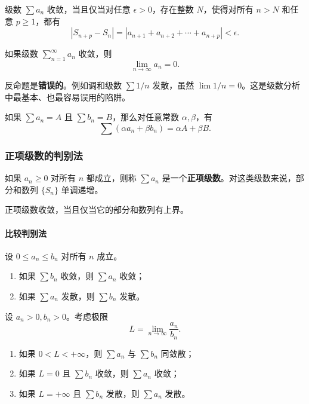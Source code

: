 \begin{theorem}
级数 $\sum a_n$ 收敛，当且仅当对任意 $\epsilon>0$，存在整数 $N$，使得对所有 $n>N$ 和任意 $p\geq 1$，都有
\[
    |S_{n+p}-S_n|=|a_{n+1}+a_{n+2}+\cdots+a_{n+p}|<\epsilon.
\]
\end{theorem}

\begin{theorem}[收敛的必要条件]
如果级数 $\sum_{n=1}^{\infty}a_n$ 收敛，则
\[
    \lim_{n\to\infty}a_n=0.
\]
\end{theorem}

反命题是\textbf{错误的}。例如调和级数 $\sum 1/n$ 发散，虽然 $\lim 1/n=0$。这是级数分析中最基本、也最容易误用的陷阱。

\begin{property}[线性性]
如果 $\sum a_n=A$ 且 $\sum b_n=B$，那么对任意常数 $\alpha,\beta$，有
\[
    \sum(\alpha a_n+\beta b_n)=\alpha A+\beta B.
\]
\end{property}

\subsubsection{正项级数的判别法}

如果 $a_n\geq0$ 对所有 $n$ 都成立，则称 $\sum a_n$ 是一个\textbf{正项级数}。对这类级数来说，部分和数列 $\{S_n\}$ 单调递增。

\begin{theorem}
正项级数收敛，当且仅当它的部分和数列有上界。
\end{theorem}

\paragraph{比较判别法}

\begin{theorem}[直接比较判别法]
设 $0\leq a_n\leq b_n$ 对所有 $n$ 成立。
\begin{enumerate}
    \item 如果 $\sum b_n$ 收敛，则 $\sum a_n$ 收敛；
    \item 如果 $\sum a_n$ 发散，则 $\sum b_n$ 发散。
\end{enumerate}
\end{theorem}

\newpage

\begin{theorem}[极限比较判别法]
设 $a_n>0,b_n>0$。考虑极限
\[
    L=\lim_{n\to\infty}\frac{a_n}{b_n}.
\]
\begin{enumerate}
    \item 如果 $0<L<+\infty$，则 $\sum a_n$ 与 $\sum b_n$ 同敛散；
    \item 如果 $L=0$ 且 $\sum b_n$ 收敛，则 $\sum a_n$ 收敛；
    \item 如果 $L=+\infty$ 且 $\sum b_n$ 发散，则 $\sum a_n$ 发散。
\end{enumerate}
\end{theorem}

